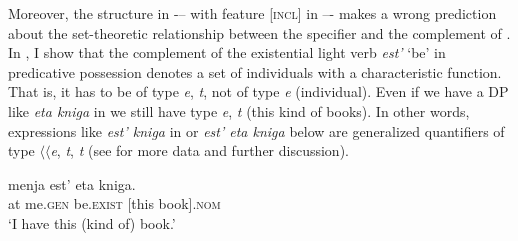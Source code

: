 \documentclass[output=paper,colorlinks,citecolor=brown,modfonts,nonflat]{langsci/langscibook}
\begin{document}
Moreover, the structure in  -– with feature [\textsc{incl}] in \liv –- makes a wrong prediction about the set-theoretic relationship between the specifier and the complement of \liv . In \citet{TsedrykInPress}, I show that the complement of the existential light verb \textit{est’} ‘be’ in predicative possession denotes a set of individuals with a characteristic function. That is, it has to be of type {\textlangle}\textit{e}, \textit{t}{\textrangle}, not of type {\textlangle}\textit{e}{\textrangle} (individual). Even if we have a DP like \textit{eta kniga} in  we still have type {\textlangle}\textit{e}, \textit{t}{\textrangle} (this kind of books). In other words, expressions like \textit{est’ kniga} in  or \textit{est’ eta kniga} below are generalized quantifiers of type ${\langle}{\langle}$\textit{e}, \textit{t}{\textrangle}, \textit{t}{\textrangle} (see \citealt{TsedrykInPress} for more data and further discussion). 

\ea%
    \label{ex:tsedryk:9}
     {menja}     {est’}           {eta} {kniga.}\\
            at me.\textsc{gen}   be.\textsc{exist}   [this book].\textsc{nom}\\
    \glt    ‘I have this (kind of) book.’
    \z
\end{document}
